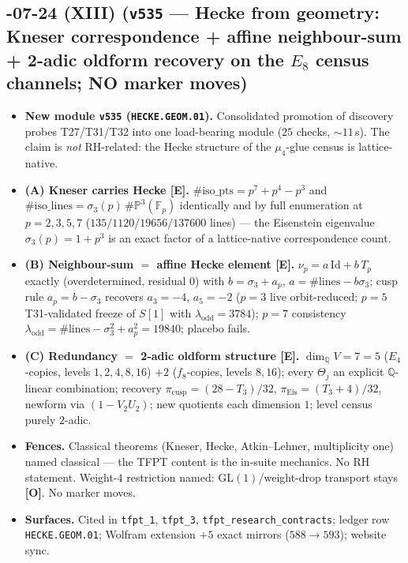 \documentclass[11pt]{article}
\providecommand{\mE}{\textbf{[E]}}\providecommand{\mC}{\textbf{[C]}}
\providecommand{\mO}{\textbf{[O]}}\providecommand{\mX}{\textbf{[X]}}
\begin{document}
\subsection*{-07-24 (XIII) (\texttt{v535} --- Hecke from geometry: Kneser correspondence + affine neighbour-sum + 2-adic oldform recovery on the $E_8$ census channels; NO marker moves)}
\begin{itemize}[leftmargin=1.5em]
\item \textbf{New module \texttt{v535} (\texttt{HECKE.GEOM.01}).} Consolidated promotion of discovery
probes T27/T31/T32 into one load-bearing module ($25$ checks, $\sim11$\,s). The claim is
\emph{not} RH-related: the Hecke structure of the $\mu_4$-glue census is lattice-native.
\item \textbf{(A) Kneser carries Hecke \mE.} $\#\mathrm{iso\_pts}=p^7+p^4-p^3$ and
$\#\mathrm{iso\_lines}=\sigma_3(p)\,\#\mathbb P^3(\mathbb F_p)$ identically and by full enumeration at
$p=2,3,5,7$ ($135/1120/19656/137600$ lines) --- the Eisenstein eigenvalue $\sigma_3(p)=1+p^3$ is an
exact factor of a lattice-native correspondence count.
\item \textbf{(B) Neighbour-sum $=$ affine Hecke element \mE.} $\nu_p=a\,\mathrm{Id}+b\,T_p$ exactly
(overdetermined, residual $0$) with $b=\sigma_3+a_p$, $a=\#\mathrm{lines}-b\sigma_3$; cusp rule
$a_p=b-\sigma_3$ recovers $a_3=-4$, $a_5=-2$ ($p=3$ live orbit-reduced; $p=5$ T31-validated freeze of
$S[1]$ with $\lambda_{\mathrm{odd}}=3784$); $p=7$ consistency
$\lambda_{\mathrm{odd}}=\#\mathrm{lines}-\sigma_3^2+a_p^2=19840$; placebo fails.
\item \textbf{(C) Redundancy $=$ 2-adic oldform structure \mE.} $\dim_{\mathbb Q}V=7=5$ ($E_4$-copies,
levels $1,2,4,8,16$) $+2$ ($f_8$-copies, levels $8,16$); every $\Theta_j$ an explicit $\mathbb Q$-linear
combination; recovery $\pi_{\mathrm{cusp}}=(28-T_3)/32$, $\pi_{\mathrm{Eis}}=(T_3+4)/32$, newform via
$(1-V_2U_2)$; new quotients each dimension $1$; level census purely $2$-adic.
\item \textbf{Fences.} Classical theorems (Kneser, Hecke, Atkin--Lehner, multiplicity one) named
classical --- the TFPT content is the in-suite mechanics. No RH statement. Weight-$4$ restriction
named: GL$(1)$/weight-drop transport stays \mO. No marker moves.
\item \textbf{Surfaces.} Cited in \texttt{tfpt\_1}, \texttt{tfpt\_3}, \texttt{tfpt\_research\_contracts};
ledger row \texttt{HECKE.GEOM.01}; Wolfram extension $+5$ exact mirrors ($588\to593$); website sync.
\end{itemize}
\end{document}
